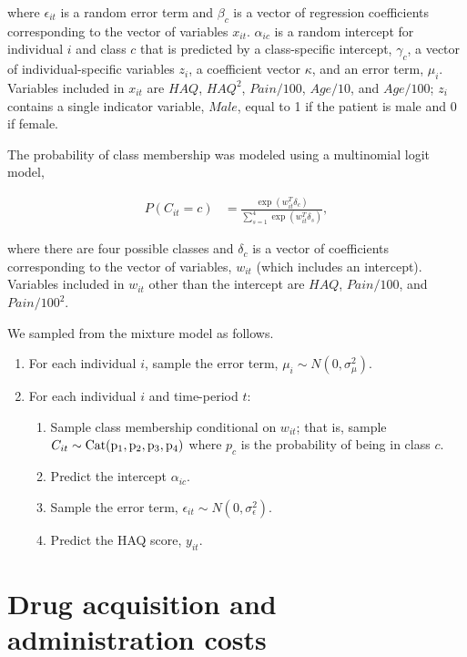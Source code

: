 \documentclass[11pt,final,fleqn]{article}\usepackage[]{graphicx}\usepackage[]{color}
\theoremstyle{plain}
\begin{document}
\begin{appendices}
where $\epsilon_{it}$ is a random error term and $\beta_{c}$ is a vector of regression coefficients corresponding to the vector of variables $x_{it}$. $\alpha_{ic}$ is a random intercept for individual $i$ and class $c$ that is predicted by a class-specific intercept, $\gamma_c$, a vector of individual-specific variables $z_{i}$, a coefficient vector $\kappa$, and an error term, $\mu_i$. Variables included in $x_{it}$ are $HAQ$, $HAQ^2$, $Pain/100$, $Age/10$, and $Age/100$; $z_{i}$ contains a single indicator variable, $Male$, equal to 1 if the patient is male and 0 if female.

The probability of class membership was modeled using a multinomial logit model,

\begin{align}
P(C_{it} = c) &= \frac{\exp(w_{it}^T\delta_c)}{\sum_{s=1}^{4}\exp(w_{it}^T\delta_s)},
\end{align}

where there are four possible classes and $\delta_c$ is a vector of coefficients corresponding to the vector of variables, $w_{it}$ (which includes an intercept). Variables included in $w_{it}$ other than the intercept are $HAQ$, $Pain/100$, and $Pain/100^2$.

We sampled from the mixture model as follows.

\begin{enumerate}
\item For each individual $i$, sample the error term, $\mu_{i} \sim N(0, \sigma^2_\mu)$.
\item For each individual $i$ and time-period $t$: 
\begin{enumerate}
\item Sample class membership conditional on $w_{it}$; that is, sample $C_{it} \sim \rm{Cat}(p_1, p_2, p_3, p_4)$ where $p_c$ is the probability of being in class $c$.
\item Predict the intercept $\alpha_{ic}$.
\item Sample the error term, $\epsilon_{it} \sim N(0, \sigma^2_\epsilon)$.
\item Predict the HAQ score, $y_{it}$. 
\end{enumerate}
\end{enumerate}

\section{Drug acquisition and administration costs}\label{app:treat-cost}



\end{appendices}
\end{document}
